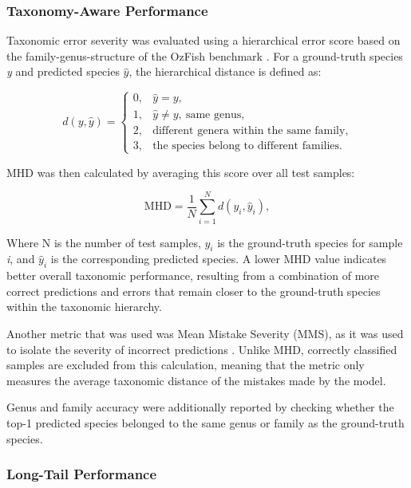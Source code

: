 \documentclass[preprint,12pt]{elsarticle}
\begin{document}
\subsubsection{Taxonomy-Aware
Performance}\label{taxonomy-aware-performance}

Taxonomic error severity was evaluated using a hierarchical error score
based on the family-genus-structure of the OzFish benchmark
\citep{ref24,ref30,ref61}. For a ground-truth species
\emph{y} and predicted species \(\widehat{y}\), the hierarchical
distance is defined as:

\begin{equation}
d(y,\widehat{y}) = \begin{cases}
0, & \widehat{y}=y, \\
1, & \widehat{y}\neq y,\ \text{same genus}, \\
2, & \text{different genera within the same family}, \\
3, & \text{the species belong to different families}.
\end{cases}
\label{eq:hierarchical-distance}
\end{equation}

MHD was then calculated by averaging this score over all test samples:

\begin{equation}
\mathrm{MHD} = \frac{1}{N}\sum_{i=1}^{N} d(y_i,\widehat{y}_i),
\label{eq:mean-hierarchical-distance}
\end{equation}

Where N is the number of test samples, \(y_{i}\) is the ground-truth
species for sample \emph{i}, and \({\widehat{y}}_{i}\) is the
corresponding predicted species. A lower MHD value indicates better
overall taxonomic performance, resulting from a combination of more
correct predictions and errors that remain closer to the ground-truth
species within the taxonomic hierarchy.

Another metric that was used was Mean Mistake Severity (MMS), as it was
used to isolate the severity of incorrect predictions
\citep{ref24}. Unlike MHD, correctly classified
samples are excluded from this calculation, meaning that the metric only
measures the average taxonomic distance of the mistakes made by the
model.

Genus and family accuracy were additionally reported by checking whether
the top-1 predicted species belonged to the same genus or family as the
ground-truth species.

\subsubsection{Long-Tail
Performance}\label{long-tail-performance}
\end{document}
